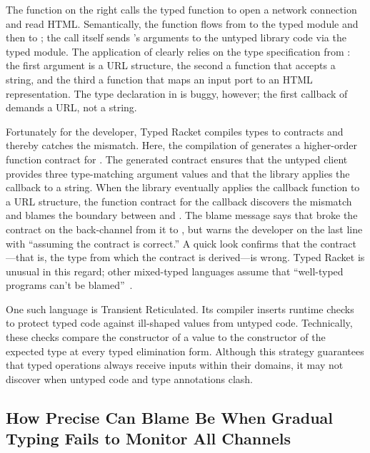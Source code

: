 The  function on the right calls the typed function to open a
network connection and read HTML. Semantically, the function
 flows from  to the typed module and then to
; the call itself sends 's arguments to the untyped
library code via the typed module. The application of  clearly
relies on the type specification from : the first
argument is a URL structure, the second a function that accepts a string,
and the third a function that maps an input port to an HTML
representation. The type declaration in  is buggy,
however; the first callback of  demands a URL, not a string.

Fortunately for the developer, Typed Racket compiles types to contracts and
thereby catches the mismatch. Here, the compilation of
 generates a higher-order function contract for
.  The generated contract ensures that the untyped client
provides three type-matching argument values and that the library applies
the callback to a string. When the  library eventually applies
the callback function to a URL structure, the function contract for the
callback discovers the mismatch and blames the boundary between 
and . The blame message says that  broke the
contract on the back-channel from it to , but warns the
developer on the last line with ``assuming the contract is correct.''
A quick look confirms that the contract---that is, the type
from which the contract is derived---is wrong. Typed Racket is unusual in this regard;
other mixed-typed languages assume that ``well-typed programs can't be
blamed''~\cite{wf-esop-2009}.

One such language is Transient Reticulated.
Its compiler inserts runtime checks to protect typed code against ill-shaped
values from untyped code.
Technically, these checks compare the constructor of a value to the constructor
of the expected type at every typed elimination form.
Although this strategy guarantees that typed operations always receive inputs
within their domains, it may not discover when untyped code and type
annotations clash.

\subsection{How Precise Can Blame Be When Gradual Typing Fails to Monitor All Channels} 
\label{sub:blame}

